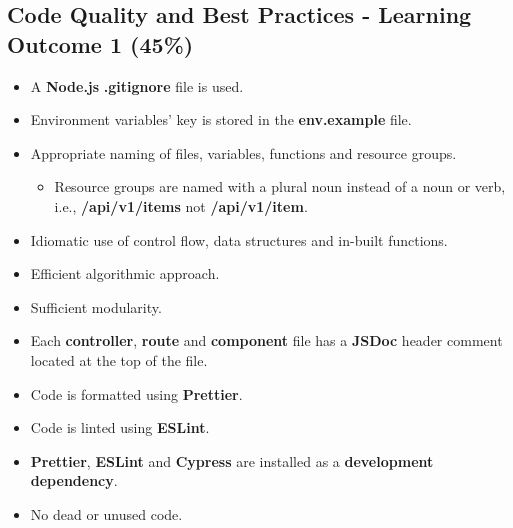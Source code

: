 \documentclass{article}
\begin{document}
\subsection*{Code Quality and Best Practices - Learning Outcome 1 (45\%)}
\begin{itemize}
	\item A \textbf{Node.js} \textbf{.gitignore} file is used.
	\item Environment variables' key is stored in the \textbf{env.example} file. 
  	\item Appropriate naming of files, variables, functions and resource groups.
  \begin{itemize}
	\item Resource groups are named with a plural noun instead of a noun or verb, i.e., \textbf{/api/v1/items} not \textbf{/api/v1/item}.
  \end{itemize}
	\item Idiomatic use of control flow, data structures and in-built functions.
  \item Efficient algorithmic approach.
  \item Sufficient modularity.
  \item Each \textbf{controller}, \textbf{route} and \textbf{component} file has a \textbf{JSDoc} header comment located at the top of the file.
  \item Code is formatted using \textbf{Prettier}.
  \item Code is linted using \textbf{ESLint}.
  \item \textbf{Prettier}, \textbf{ESLint} and \textbf{Cypress} are installed as a \textbf{development dependency}.	
\item No dead or unused code. 
\end{itemize}
\end{document}

